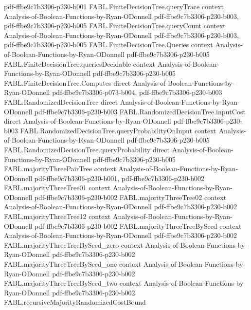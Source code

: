 \begin{theorem}
{    pdf-ffbe9c7b3306-p230-b001}
\proofstep
  {FABL.FiniteDecisionTree.queryTrace}
  {context}
  {Analysis-of-Boolean-Functions-by-Ryan-ODonnell}
  {pdf-ffbe9c7b3306-p230-b003,
    pdf-ffbe9c7b3306-p230-b005}
\proofstep
  {FABL.FiniteDecisionTree.queryCount}
  {context}
  {Analysis-of-Boolean-Functions-by-Ryan-ODonnell}
  {pdf-ffbe9c7b3306-p230-b003,
    pdf-ffbe9c7b3306-p230-b005}
\proofstep
  {FABL.FiniteDecisionTree.Queries}
  {context}
  {Analysis-of-Boolean-Functions-by-Ryan-ODonnell}
  {pdf-ffbe9c7b3306-p230-b005}
\proofstep
  {FABL.FiniteDecisionTree.queriesDecidable}
  {context}
  {Analysis-of-Boolean-Functions-by-Ryan-ODonnell}
  {pdf-ffbe9c7b3306-p230-b005}
\proofstep
  {FABL.FiniteDecisionTree.Computes}
  {direct}
  {Analysis-of-Boolean-Functions-by-Ryan-ODonnell}
  {pdf-ffbe9c7b3306-p073-b004,
    pdf-ffbe9c7b3306-p230-b003}
\proofstep
  {FABL.RandomizedDecisionTree}
  {direct}
  {Analysis-of-Boolean-Functions-by-Ryan-ODonnell}
  {pdf-ffbe9c7b3306-p230-b003}
\proofstep
  {FABL.RandomizedDecisionTree.inputCost}
  {direct}
  {Analysis-of-Boolean-Functions-by-Ryan-ODonnell}
  {pdf-ffbe9c7b3306-p230-b003}
\proofstep
  {FABL.RandomizedDecisionTree.queryProbabilityOnInput}
  {context}
  {Analysis-of-Boolean-Functions-by-Ryan-ODonnell}
  {pdf-ffbe9c7b3306-p230-b005}
\proofstep
  {FABL.RandomizedDecisionTree.queryProbability}
  {direct}
  {Analysis-of-Boolean-Functions-by-Ryan-ODonnell}
  {pdf-ffbe9c7b3306-p230-b005}
\proofstep
  {FABL.majorityThreePairTree}
  {context}
  {Analysis-of-Boolean-Functions-by-Ryan-ODonnell}
  {pdf-ffbe9c7b3306-p230-b001,
    pdf-ffbe9c7b3306-p230-b002}
\proofstep
  {FABL.majorityThreeTree01}
  {context}
  {Analysis-of-Boolean-Functions-by-Ryan-ODonnell}
  {pdf-ffbe9c7b3306-p230-b002}
\proofstep
  {FABL.majorityThreeTree02}
  {context}
  {Analysis-of-Boolean-Functions-by-Ryan-ODonnell}
  {pdf-ffbe9c7b3306-p230-b002}
\proofstep
  {FABL.majorityThreeTree12}
  {context}
  {Analysis-of-Boolean-Functions-by-Ryan-ODonnell}
  {pdf-ffbe9c7b3306-p230-b002}
\proofstep
  {FABL.majorityThreeTreeBySeed}
  {context}
  {Analysis-of-Boolean-Functions-by-Ryan-ODonnell}
  {pdf-ffbe9c7b3306-p230-b002}
\proofstep
  {FABL.majorityThreeTreeBySeed_zero}
  {context}
  {Analysis-of-Boolean-Functions-by-Ryan-ODonnell}
  {pdf-ffbe9c7b3306-p230-b002}
\proofstep
  {FABL.majorityThreeTreeBySeed_one}
  {context}
  {Analysis-of-Boolean-Functions-by-Ryan-ODonnell}
  {pdf-ffbe9c7b3306-p230-b002}
\proofstep
  {FABL.majorityThreeTreeBySeed_two}
  {context}
  {Analysis-of-Boolean-Functions-by-Ryan-ODonnell}
  {pdf-ffbe9c7b3306-p230-b002}
\proofstep
  {FABL.recursiveMajorityRandomizedCostBound}

\end{theorem}
